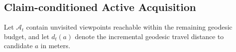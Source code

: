 \documentclass[letterpaper, 10 pt, conference]{ieeeconf}
\newcommand{\method}{SafeVantage}
\begin{document}


\subsection{Claim-conditioned Active Acquisition}
\label{sec:active_acquisition}

Let $\mathcal{A}_t$ contain unvisited viewpoints reachable within the
remaining geodesic budget, and let $d_t(a)$ denote the incremental
geodesic travel distance to candidate $a$ in meters.

\end{document}
